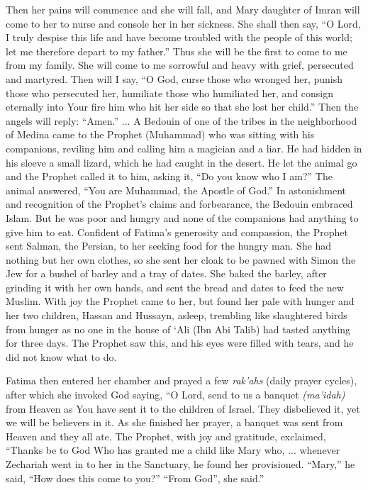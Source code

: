 \begin{quotationx}
Then her pains will commence and she will fall, and Mary daughter of Imran will come to her to nurse and console her in her sickness. She shall then say, ``O Lord, I truly despise this life and have become troubled with the people of this world; let me therefore depart to my father.'' Thus she will be the first to come to me from my family. She will come to me sorrowful and heavy with grief, persecuted and martyred. Then will I say, ``O God, curse those who wronged her, punish those who persecuted her, humiliate those who humiliated her, and consign eternally into Your fire him who hit her side so that she lost her child.'' Then the angels will reply: ``Amen.'' ... A Bedouin of one of the tribes in the neighborhood of Medina came to the Prophet (Muhammad) who was sitting with his companions, reviling him and calling him a magician and a liar. He had hidden in his sleeve a small lizard, which he had caught in the desert. He let the animal go and the Prophet called it to him, asking it, ``Do you know who I am?'' The animal answered, ``You are Muhammad, the Apostle of God.'' In astonishment and recognition of the Prophet's claims and forbearance, the Bedouin embraced Islam. But he was poor and hungry and none of the companions had anything to give him to eat. Confident of Fatima's generosity and compassion, the Prophet sent Salman, the Persian, to her seeking food for the hungry man. She had nothing but her own clothes, so she sent her cloak to be pawned with Simon the Jew for a bushel of barley and a tray of dates. She baked the barley, after grinding it with her own hands, and sent the bread and dates to feed the new Muslim. With joy the Prophet came to her, but found her pale with hunger and her two children, Hassan and Hussayn, asleep, trembling like slaughtered birds from hunger as no one in the house of `Ali (Ibn Abi Talib) had tasted anything for three days. The Prophet saw this, and his eyes were filled with tears, and he did not know what to do.

Fatima then entered her chamber and prayed a few \emph{rak'ahs} (daily prayer cycles), after which she invoked God saying, ``O Lord, send to us a banquet \emph{(ma'idah)} from Heaven as You have sent it to the children of Israel. They disbelieved it, yet we will be believers in it. As she finished her prayer, a banquet was sent from Heaven and they all ate. The Prophet, with joy and gratitude, exclaimed, ``Thanks be to God Who has granted me a child like Mary who, ... whenever Zechariah went in to her in the Sanctuary, he found her provisioned. ``Mary,'' he said, ``How does this come to you?'' ``From God'', she said.''
\end{quotationx}


